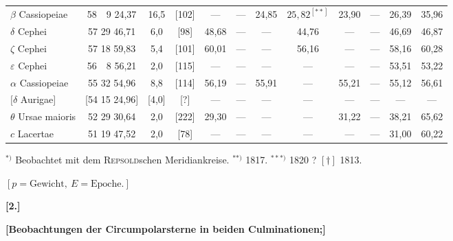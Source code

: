 \documentclass[12pt,a4paper]{article}
\theoremstyle{plain}
\theoremstyle{definition}
\theoremstyle{remark}
\begin{document}
\begin{center}
{\begin{longtable}{l|c|c|c|c|c|c|c|c|c|c|c}
$\beta$ Cassiopeiae & 58\ \ 9 24,37 & 16,5 & [102] & --- & --- & 24,85 & $25,82^{[**]}$ & 23,90 & --- & 26,39 & 35,96 \\
$\delta$ Cephei & 57 29 46,71 & 6,0 & [98] & 48,68 & --- & --- & 44,76 & --- & --- & 46,69 & 46,87 \\
$\zeta$ Cephei & 57 18 59,83 & 5,4 & [101] & 60,01 & --- & --- & 56,16 & --- & --- & 58,16 & 60,28 \\
$\varepsilon$ Cephei & 56\ \ 8 56,21 & 2,0 & [115] & --- & --- & --- & --- & --- & --- & 53,51 & 53,22 \\
$\alpha$ Cassiopeiae & 55 32 54,96 & 8,8 & [114] & 56,19 & --- & 55,91 & --- & 55,21 & --- & 55,12 & 56,61 \\
$[\delta$ Aurigae] & [54 15 24,96] & [4,0] & [?] & --- & --- & --- & --- & --- & --- & --- & --- \\
$\theta$ Ursae maioris & 52 29 30,64 & 2,0 & [222] & 29,30 & --- & --- & --- & 31,22 & --- & 38,21 & 65,62 \\
$c$ Lacertae & 51 19 47,52 & 2,0 & [78] & --- & --- & --- & --- & --- & --- & 31,00 & 60,22 \\
\end{longtable}
}
\end{center}

\smallskip
$^{*)}$ Beobachtet mit dem \textsc{Repsold}schen Meridiankreise.\quad
$^{**)}$ 1817.\quad
$^{***)}$ 1820 ?\quad
$[\dagger]$ 1813.

\smallskip
\begin{center}
$[p = \text{Gewicht},\ E = \text{Epoche}.]$
\end{center}

\newpage
\begin{center}
\textbf{[2.]}
\end{center}

\begin{center}
\textbf{[Beobachtungen der Circumpolarsterne in beiden Culminationen;]}
\end{center}
\end{document}
